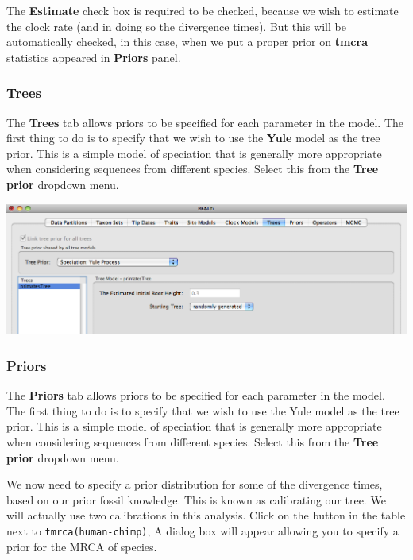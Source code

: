 \documentclass[12pt]{article}
\begin{document}
\medskip{}

The \textbf{Estimate} check box is required to be checked, because we wish to estimate
the clock rate (and in doing so the divergence times). But this will be automatically checked, in this case, when we put a proper prior on \textbf{tmcra} statistics appeared in \textbf{Priors} panel.

\subsubsection*{Trees }

The {\bf Trees} tab allows priors to be specified for each parameter in the
model. The first thing to do is to specify that we wish to use the \textbf{Yule} model 
as the tree prior. This is a simple model of speciation that
is generally more appropriate when considering sequences from different species.
Select this from the {\bf Tree prior} dropdown menu.

\medskip{}

\includegraphics[scale=0.4]{figures/BEAUti_Tree}

\medskip{}

\subsubsection*{Priors }

The {\bf Priors} tab allows priors to be specified for each parameter in the
model. The first thing to do is to specify that we wish to use the Yule model 
as the tree prior. This is a simple model of speciation that
is generally more appropriate when considering sequences from different species.
Select this from the {\bf Tree prior} dropdown menu.

We now need to specify a prior distribution for some of the divergence times, based on our prior fossil knowledge. This is known
as calibrating our tree. We will actually use two calibrations
in this analysis. Click on the button in the table next to \texttt{tmrca(human-chimp)}, A dialog box will appear allowing you to specify a prior for the MRCA of species. 
\end{document}
